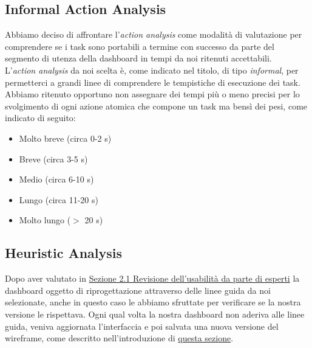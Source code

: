 \subsection{Informal Action Analysis}
\label{ss:informal-action-analysis}
Abbiamo deciso di affrontare l'\textit{action analysis} come modalità di valutazione per comprendere se i task sono portabili a termine con successo da parte del segmento di utenza della dashboard in tempi da noi ritenuti accettabili.\\
L'\textit{action analysis} da noi scelta è, come indicato nel titolo, di tipo \textit{informal}, per permetterci a grandi linee di comprendere le tempistiche di esecuzione dei task.\\
Abbiamo ritenuto opportuno non assegnare dei tempi più o meno precisi per lo svolgimento di ogni azione atomica che compone un task ma bensì dei pesi, come indicato di seguito:
\begin{itemize}
    \item Molto breve (circa 0-2 s)
    \item Breve (circa 3-5 s) 
    \item Medio (circa 6-10 s) 
    \item Lungo (circa 11-20 s) 
    \item Molto lungo ($>$ 20 s)
\end{itemize}








\subsection{Heuristic Analysis}
\label{ss:heuristic-analysis}
Dopo aver valutato in \hyperref[sss:revisione-usabilita-esperti]{Sezione 2.1 Revisione dell'usabilità da parte di esperti} la dashboard oggetto di riprogettazione attraverso delle linee guida da noi selezionate, anche in questo caso le abbiamo sfruttate per verificare se la nostra versione le rispettava.
Ogni qual volta la nostra dashboard non aderiva alle linee guida, veniva aggiornata l'interfaccia e poi salvata una nuova versione del wireframe, come descritto nell'introduzione di \hyperref[s:inspection]{questa sezione}.

